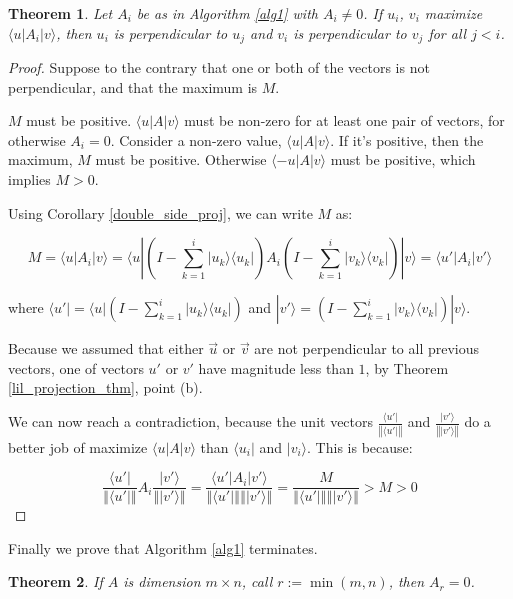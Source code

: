 \documentclass{amsbook}
\newtheorem{theorem}{Theorem}
\begin{document}
 \begin{theorem}
Let $A_i$ be as in Algorithm \ref{alg1} with $A_i\neq0$.  If $u_i$, $v_i$ maximize $\langle u |A_i| v \rangle$, then $u_i$ is perpendicular to $u_j$ and $v_i$ is perpendicular to $v_j$ for all $j<i$.
 \end{theorem}

\begin{proof}
\label{svd_perpendicular}
Suppose to the contrary that one or both of the vectors is not perpendicular, and that the maximum is $M$.

$M$ must be positive.  $\langle u|A|v\rangle$ must be non-zero for at least one pair of vectors, for otherwise $A_i=0$.  Consider a non-zero value, $\langle u|A|v\rangle$.  If it's positive, then the maximum, $M$ must be positive.  Otherwise $\langle -u|A|v\rangle$ must be positive, which implies $M>0$.

Using Corollary \ref{double_side_proj}, we can write $M$ as:

$$
M=\langle u |A_i| v \rangle=\langle u |\left(I-\sum_{k=1}^i| u _k\rangle\langle u _k|\right)A_i\left(I-\sum_{k=1}^{i}| v _k\rangle\langle v _k|\right)| v \rangle=\langle u '|A_i| v '\rangle
$$

where $\langle u'|=\langle u |\left(I-\sum_{k=1}^i| u _k\rangle\langle u _k|\right)$ and $|v'\rangle=\left(I-\sum_{k=1}^{i}| v _k\rangle\langle v _k|\right)| v \rangle$.

Because we assumed that either $\vec u$ or $\vec v$ are not perpendicular to all previous vectors, one of vectors $ u '$ or $ v '$ have magnitude less than $1$, by Theorem \ref{lil_projection_thm}, point (b).

We can now reach a contradiction, because the unit vectors $\frac{\langle u '|}{\left\Vert\langle u '|\right\Vert}$ and $\frac{| v '\rangle}{\left\Vert| v '\rangle\right\Vert}$ do a better job of maximize $\langle u|A|v\rangle$ than $\langle u_i|$ and $|v_i\rangle$.  This is because:

$$
\frac{\langle u '|}{\left\Vert\langle u '|\right\Vert}A_i\frac{| v '\rangle}{\left\Vert| v '\rangle\right\Vert} = \frac{\langle u'|A_i|v'\rangle}{\left\Vert\langle u '|\right\Vert\left\Vert| v '\rangle\right\Vert} = \frac{M}{\left\Vert\langle u '|\right\Vert\left\Vert| v '\rangle\right\Vert} > M >0
$$

\end{proof}

Finally we prove that Algorithm \ref{alg1} terminates.

 \begin{theorem}
\label{svd_terminates}
If $A$ is dimension $m\times n$, call $r:=\min(m,n)$, then $A_r=0$.
 \end{theorem}
\end{document}
